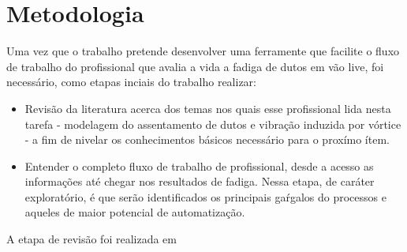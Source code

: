 \chapter{Metodologia}\label{chap:metodologia}


Uma vez que o trabalho pretende desenvolver uma ferramente que facilite o fluxo de trabalho do profissional que avalia a vida a fadiga de dutos em vão live, foi necessário, como etapas inciais do trabalho realizar:

\begin{itemize}
    \item Revisão da literatura acerca dos temas nos quais esse profissional lida nesta tarefa - modelagem do assentamento de dutos e vibração induzida por vórtice - a fim de nivelar os conhecimentos básicos necessário para o proxímo ítem.
    \item Entender o completo fluxo de trabalho de profissional, desde a acesso as informações até chegar nos resultados de fadiga. Nessa etapa, de caráter exploratório, é que serão identificados os principais gaŕgalos do processos e aqueles de maior potencial de automatização.
\end{itemize}

 A etapa de revisão foi realizada em